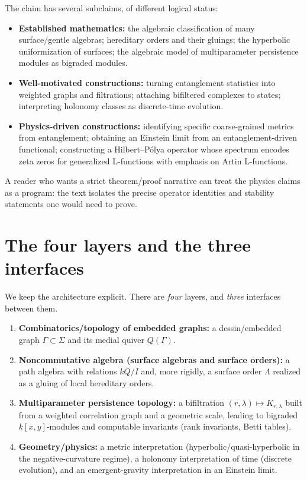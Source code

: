 \documentclass[11pt,oneside]{amsbook}
\numberwithin{equation}{section}
\theoremstyle{plain}
\theoremstyle{definition}
\theoremstyle{remark}
\begin{document}
The claim has several subclaims, of different logical status:
\begin{itemize}
\item \textbf{Established mathematics:} the algebraic classification of many surface/gentle algebras; hereditary orders and their gluings; the hyperbolic uniformization of surfaces; the algebraic model of multiparameter persistence modules as bigraded modules.
\item \textbf{Well-motivated constructions:} turning entanglement statistics into weighted graphs and filtrations; attaching bifiltered complexes to states; interpreting holonomy classes as discrete-time evolution.
\item \textbf{Physics-driven constructions:} identifying specific coarse-grained metrics from entanglement; obtaining an Einstein limit from an entanglement-driven functional; constructing a Hilbert--Pólya operator whose spectrum encodes zeta zeros for generalized L-functions with emphasis on Artin L-functions.
\end{itemize}

A reader who wants a strict theorem/proof narrative can treat the physics claims as a program:
the text isolates the precise operator identities and stability statements one would need to prove.

\section*{The four layers and the three interfaces}

We keep the architecture explicit.
There are \emph{four} layers, and \emph{three} interfaces between them.

\begin{enumerate}
\item \textbf{Combinatorics/topology of embedded graphs:}
a dessin/embedded graph $\Gamma\subset \Sigma$ and its medial quiver $Q(\Gamma)$.
\item \textbf{Noncommutative algebra (surface algebras and surface orders):}
a path algebra with relations $kQ/I$ and, more rigidly, a surface order $\Lambda$ realized as a gluing of local hereditary orders.
\item \textbf{Multiparameter persistence topology:}
a bifiltration $(r,\lambda)\mapsto K_{r,\lambda}$ built from a weighted correlation graph and a geometric scale,
leading to bigraded $k[x,y]$-modules and computable invariants (rank invariants, Betti tables).
\item \textbf{Geometry/physics:}
a metric interpretation (hyperbolic/quasi-hyperbolic in the negative-curvature regime),
a holonomy interpretation of time (discrete evolution),
and an emergent-gravity interpretation in an Einstein limit.
\end{enumerate}
\end{document}
